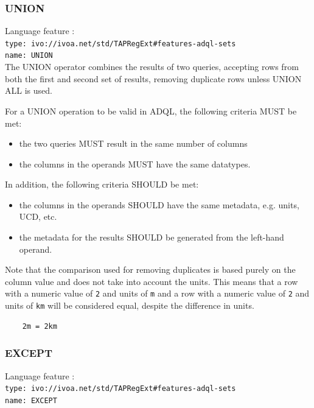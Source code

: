 \documentclass[11pt,a4paper]{ivoa}
\begin{document}
\subsubsection{UNION}
{\footnotesize Language feature :}\\
{\footnotesize \verb|type: ivo://ivoa.net/std/TAPRegExt#features-adql-sets|}\\
{\footnotesize \verb|name: UNION|}\\

The UNION operator combines the results of two queries, accepting rows from
both the first and second set of results,
removing duplicate rows unless UNION ALL is used.

For a UNION operation to be valid in ADQL, the following criteria MUST be met:
\begin{itemize}
    \item the two queries MUST result in the same number of columns
    \item the columns in the operands MUST have the same datatypes.
\end{itemize}

In addition, the following criteria SHOULD be met: 
\begin{itemize}
    \item the columns in the operands SHOULD have the same metadata, e.g. units, UCD, etc.
    \item the metadata for the results SHOULD be generated from the left-hand operand.
\end{itemize}

Note that the comparison used for removing duplicates is based purely on the
column value and does not take into account the units.
This means that a row with a numeric value of \verb:2: and units of \verb:m:
and a row with a numeric value of \verb:2: and units of \verb:km: will be
considered equal, despite the difference in units.
\begin{verbatim}
    2m = 2km
\end{verbatim}

\subsubsection{EXCEPT}
{\footnotesize Language feature :}\\
{\footnotesize \verb|type: ivo://ivoa.net/std/TAPRegExt#features-adql-sets|}\\
{\footnotesize \verb|name: EXCEPT|}\\
\end{document}
